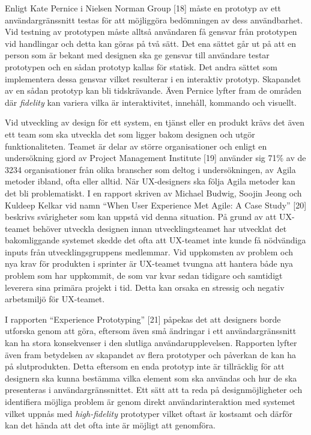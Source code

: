 \documentclass[12pt]{kththesis}
\begin{document}
Enligt Kate Pernice i Nielsen Norman Group [18] måste en prototyp av ett användargränssnitt testas för att möjliggöra bedömningen av dess användbarhet. Vid testning av prototypen måste alltså användaren få gensvar från prototypen vid handlingar och detta kan göras på två sätt. Det ena sättet går ut på att en person som är bekant med designen ska ge gensvar till användare testar prototypen och en sådan prototyp kallas för statisk. Det andra sättet som implementera dessa gensvar vilket resulterar i en interaktiv prototyp. Skapandet av en sådan prototyp kan bli tidskrävande. Även Pernice lyfter fram de områden där \textit{fidelity} kan variera vilka är interaktivitet, innehåll, kommando och visuellt. 

Vid utveckling av design för ett system, en tjänst eller en produkt krävs det även ett team som ska utveckla det som ligger bakom designen och utgör funktionaliteten. Teamet är delar av större organisationer och enligt en undersökning gjord av Project Management Institute [19] använder sig 71\% av de 3234 organisationer från olika branscher som deltog i undersökningen, av Agila metoder ibland, ofta eller alltid. När UX-designers ska följa Agila metoder kan det bli problematiskt. I en rapport skriven av Michael Budwig, Soojin Jeong och Kuldeep Kelkar vid namn “When User Experience Met Agile: A Case Study” [20] beskrivs svårigheter som kan uppstå vid denna situation. På grund av att UX-teamet behöver utveckla designen innan utvecklingsteamet har utvecklat det bakomliggande systemet skedde det ofta att UX-teamet inte kunde få nödvändiga inputs från utvecklingsgruppens medlemmar. Vid uppkomsten av problem och nya krav för produkten i sprinter är UX-teamet tvungna att hantera både nya problem som har uppkommit, de som var kvar sedan tidigare och samtidigt leverera sina primära projekt i tid. Detta kan orsaka en stressig och negativ arbetsmiljö för UX-teamet. 

I rapporten “Experience Prototyping” [21] påpekas det att designers borde utforska genom att göra, eftersom även små ändringar i ett användargränssnitt kan ha stora konsekvenser i den slutliga användarupplevelsen. Rapporten lyfter även fram betydelsen av skapandet av flera prototyper och påverkan de kan ha på slutprodukten. Detta eftersom en enda prototyp inte är tillräcklig för att designern ska kunna bestämma vilka element som ska användas och hur de ska presenteras i användargränssnittet. Ett sätt att ta reda på designmöjligheter och identifiera möjliga problem är genom direkt användarinteraktion med systemet vilket uppnås med \textit{high-fidelity} prototyper vilket oftast är kostsamt och därför kan det hända att det ofta inte är möjligt att genomföra.
\end{document}
